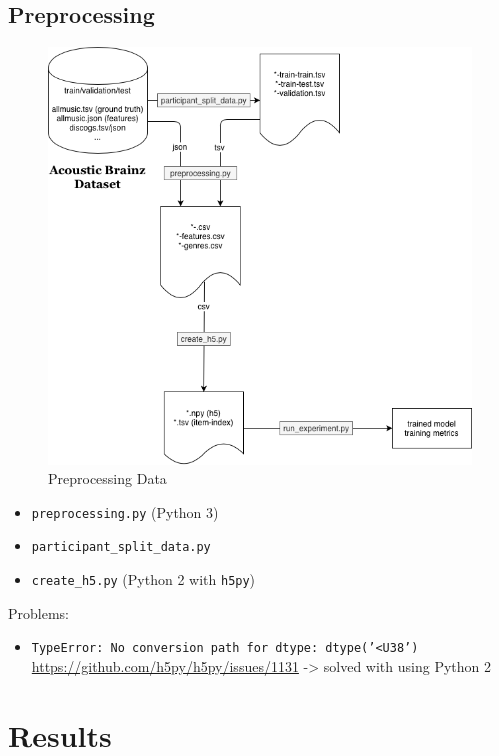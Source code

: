 \documentclass[sigconf,nonacm]{acmart}
\begin{document}
\subsection{Preprocessing}
  \begin{figure}
    \includegraphics[width=\linewidth]{Preprocess-Data.png}
    \caption{Preprocessing Data}
    \label{fig:preprocess}
  \end{figure}

  \begin{itemize}
    \item \texttt{preprocessing.py} (Python 3)
    \item \texttt{participant\_split\_data.py}
    \item \texttt{create\_h5.py} (Python 2 with \texttt{h5py})
  \end{itemize}

  Problems:
  \begin{itemize}
    \item \texttt{TypeError: No conversion path for dtype: dtype('<U38')} \url{https://github.com/h5py/h5py/issues/1131}
    -> solved with using Python 2
  \end{itemize}

\section{Results}
\end{document}
